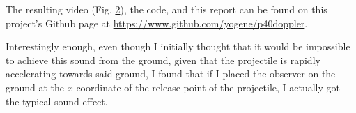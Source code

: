 \documentclass[%
 reprint,
 amsmath,amssymb,
 aps,
]{revtex4-1}
\begin{document}
\begin{figure}\label{fig:freqplot}
\end{figure}

The resulting video (Fig. \ref{fig:video}), the code, and this report can be found on this project's Github page at \url{https://www.github.com/yogene/p40doppler}.

Interestingly enough, even though I initially thought that it would be impossible to achieve this sound from the ground, given that the projectile is rapidly accelerating towards said ground, I found that if I placed the observer on the ground at the $x$ coordinate of the release point of the projectile, I actually got the typical sound effect.

\begin{figure}\label{fig:video}
\end{figure}
\end{document}
